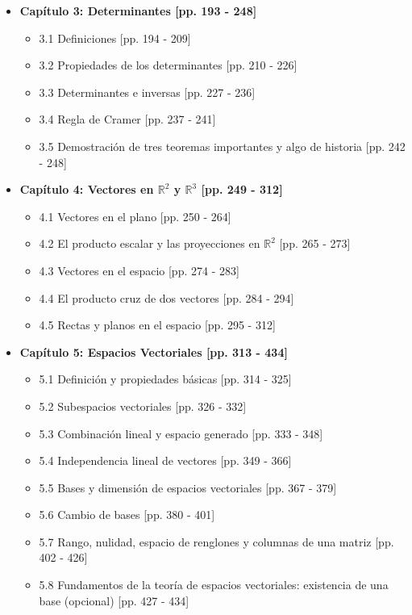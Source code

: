 \documentclass[11pt,a4paper]{article}
\begin{document}
\begin{itemize}
    \item \textbf{Capítulo 3: Determinantes [pp. 193 - 248]}
    \begin{itemize}
        \item 3.1 Definiciones [pp. 194 - 209]
        \item 3.2 Propiedades de los determinantes [pp. 210 - 226]
        \item 3.3 Determinantes e inversas [pp. 227 - 236]
        \item 3.4 Regla de Cramer [pp. 237 - 241]
        \item 3.5 Demostración de tres teoremas importantes y algo de historia [pp. 242 - 248]
    \end{itemize}

    \item \textbf{Capítulo 4: Vectores en $\mathbb{R}^2$ y $\mathbb{R}^3$ [pp. 249 - 312]}
    \begin{itemize}
        \item 4.1 Vectores en el plano [pp. 250 - 264]
        \item 4.2 El producto escalar y las proyecciones en $\mathbb{R}^2$ [pp. 265 - 273]
        \item 4.3 Vectores en el espacio [pp. 274 - 283]
        \item 4.4 El producto cruz de dos vectores [pp. 284 - 294]
        \item 4.5 Rectas y planos en el espacio [pp. 295 - 312]
    \end{itemize}

    \item \textbf{Capítulo 5: Espacios Vectoriales [pp. 313 - 434]}
    \begin{itemize}
        \item 5.1 Definición y propiedades básicas [pp. 314 - 325]
        \item 5.2 Subespacios vectoriales [pp. 326 - 332]
        \item 5.3 Combinación lineal y espacio generado [pp. 333 - 348]
        \item 5.4 Independencia lineal de vectores [pp. 349 - 366]
        \item 5.5 Bases y dimensión de espacios vectoriales [pp. 367 - 379]
        \item 5.6 Cambio de bases [pp. 380 - 401]
        \item 5.7 Rango, nulidad, espacio de renglones y columnas de una matriz [pp. 402 - 426]
        \item 5.8 Fundamentos de la teoría de espacios vectoriales: existencia de una base (opcional) [pp. 427 - 434]
    \end{itemize}


\end{itemize}
\end{document}
